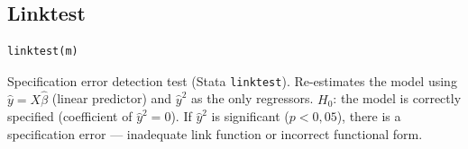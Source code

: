 \subsection{Linktest}

\begin{lstlisting}
linktest(m)
\end{lstlisting}

Specification error detection test (Stata \texttt{linktest}). Re-estimates
the model using $\hat{y} = X\hat{\beta}$ (linear predictor) and $\hat{y}^2$
as the only regressors. $H_0$: the model is correctly specified
(coefficient of $\hat{y}^2 = 0$). If $\hat{y}^2$ is significant
($p < 0{,}05$), there is a specification error --- inadequate link
function or incorrect functional form.
